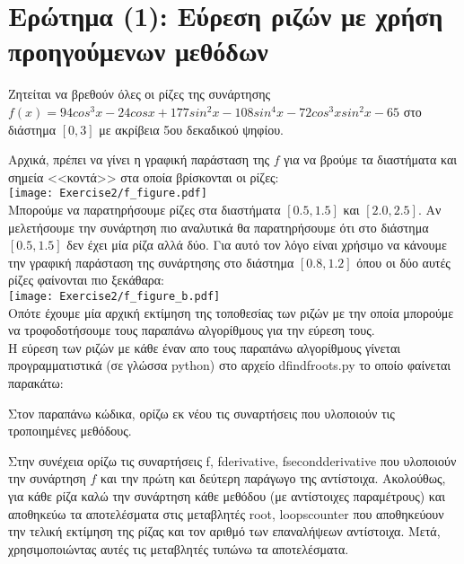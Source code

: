 \documentclass[a4paper,11pt]{article}
\newcommand{\lt}{\latintext}
\newcommand{\gt}{\greektext}
\begin{document}
\section{Ερώτημα (1): Εύρεση ριζών με χρήση προηγούμενων μεθόδων}
Ζητείται να βρεθούν όλες οι ρίζες της συνάρτησης {\lt $f(x) = 94cos^3x - 24cosx + 177sin^2x - 108sin^4x - 72cos^3xsin^2x -65$} στο διάστημα {\lt $[0, 3]$} με ακρίβεια 5ου δεκαδικού ψηφίου. 

\par
Αρχικά, πρέπει να γίνει η γραφική παράσταση της $f$ για να βρούμε τα διαστήματα και σημεία <<κοντά>> στα οποία βρίσκονται οι ρίζες:\\
\texttt{[image: Exercise2/f\_figure.pdf]}\\

Μπορούμε να παρατηρήσουμε ρίζες στα διαστήματα $[0.5, 1.5]$ και $[2.0, 2.5]$. Αν μελετήσουμε την συνάρτηση πιο αναλυτικά θα παρατηρήσουμε ότι στο διάστημα $[0.5, 1.5]$ δεν έχει μία ρίζα αλλά δύο. Για αυτό τον λόγο είναι χρήσιμο να κάνουμε την γραφική παράσταση της συνάρτησης στο διάστημα $[0.8, 1.2]$ όπου οι δύο αυτές ρίζες φαίνονται πιο ξεκάθαρα:\\

\texttt{[image: Exercise2/f\_figure\_b.pdf]}\\

Οπότε έχουμε μία αρχική εκτίμηση της τοποθεσίας των ριζών με την οποία μπορούμε να τροφοδοτήσουμε τους παραπάνω αλγορίθμους για την εύρεση τους.\\

Η εύρεση των ριζών με κάθε έναν απο τους παραπάνω αλγορίθμους γίνεται προγραμματιστικά (σε γλώσσα {\lt python}) στο αρχείο {\lt d\textunderscore find\textunderscore f\textunderscore roots.py} το οποίο φαίνεται παρακάτω:

\lt

\gt

Στον παραπάνω κώδικα, ορίζω εκ νέου τις συναρτήσεις που υλοποιούν τις τροποιημένες μεθόδους.

Στην συνέχεια ορίζω τις συναρτήσεις {\lt f, f\textunderscore derivative, f\textunderscore second\textunderscore derivative} που υλοποιούν την συνάρτηση $f$ και την πρώτη και δεύτερη παράγωγο της αντίστοιχα.
Ακολούθως, για κάθε ρίζα καλώ την συνάρτηση κάθε μεθόδου (με αντίστοιχες παραμέτρους) και αποθηκεύω τα αποτελέσματα στις μεταβλητές {\lt root, loops\textunderscore counter} που αποθηκεύουν την τελική εκτίμηση της ρίζας και τον αριθμό των επαναλήψεων αντίστοιχα. Μετά, χρησιμοποιώντας αυτές τις μεταβλητές τυπώνω τα αποτελέσματα.\\
\end{document}
